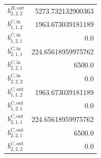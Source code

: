 \documentclass{article}%
\begin{document}
\begin{multicols*}{3}
\begin{supertabular}{lr}
	$b_{2,2,2}^{H,\text{out}}$ & 5273.732132900363 \\%
	$b_{1,1,2}^{C,\text{in}}$ & 1963.673039181189 \\%
	$b_{1,2,1}^{C,\text{in}}$ & 0.0 \\%
	$b_{2,1,1}^{C,\text{in}}$ & 224.65618959975762 \\%
	$b_{2,2,1}^{C,\text{in}}$ & 6500.0 \\%
	$b_{2,2,2}^{C,\text{in}}$ & 0.0 \\%
	$b_{1,1,2}^{C,\text{out}}$ & 1963.673039181189 \\%
	$b_{1,2,1}^{C,\text{out}}$ & 0.0 \\%
	$b_{2,1,1}^{C,\text{out}}$ & 224.65618959975762 \\%
	$b_{2,2,1}^{C,\text{out}}$ & 6500.0 \\%
	$b_{2,2,2}^{C,\text{out}}$ & 0.0 \\%
\end{supertabular}%
\end{multicols*}%
\end{document}
